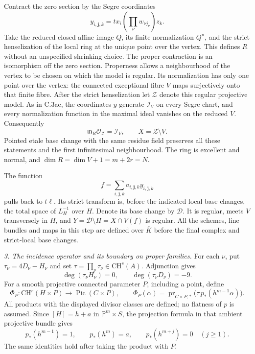 Contract the zero section by the Segre coordinates
\[
 y_{i,\mathbf j,k}=t x_i\left(\prod_\nu w_{\nu j_\nu}\right)z_k.
\]
Take the reduced closed affine image $Q$, its finite normalization
$Q^{\mathrm n}$, and the strict henselization of the local ring
at the unique point over the vertex. This defines $R$ without
an unspecified shrinking choice. The proper contraction is an
isomorphism off the zero section. Properness allows a neighbourhood
of the vertex to be chosen on which the model is regular. Its
normalization has only one point over the vertex: the connected
exceptional fibre $V$ maps surjectively onto that finite fibre.
After the strict henselization let $\mathcal Z$ denote this regular
projective model. As in C.3ae, the coordinates $y$ generate
$\mathcal I_V$ on every Segre chart, and every normalization
function in the maximal ideal vanishes on the reduced $V$.
Consequently
\[
 \mathfrak m_R\mathcal O_{\mathcal Z}=\mathcal I_V,
 \qquad X=\mathcal Z\setminus V.
\]
Pointed etale base change with the same residue field preserves
all these statements and the first infinitesimal neighbourhood.
The ring is excellent and normal, and
$\dim R=\dim V+1=m+2r=N$.

The function
\[
 f=\sum_{i,\mathbf j,k}a_{i,\mathbf j,k}y_{i,\mathbf j,k}
\]
pulls back to $t\ell$. Its strict transform is, before the
indicated local base changes, the total space of $L_H^{-1}$
over $H$. Denote its base change by $\mathcal D$. It is regular,
meets $V$ transversely in $H$, and
$Y=\mathcal D\setminus H=X\cap V(f)$ is regular. All the
schemes, line bundles and maps in this step are defined over
$\overline K$ before the final complex and strict-local base changes.

\emph{3. The incidence operator and its boundary on proper families.}
For each $\nu$, put $\tau_\nu=4D_\nu-H_\nu$ and set
$\tau=\prod_\nu\tau_\nu\in\mathrm{CH}^{s}(A)$. Adjunction gives
\[
 \deg(\tau_\nu H_\nu)=0,\qquad
 \deg(\tau_\nu D_\nu)=-9.
\]
For a smooth projective connected parameter $P$, including
a point, define
\[
 \Phi_P:\mathrm{CH}^r(H\times P)\longrightarrow
                  \operatorname{Pic}(C\times P),
 \qquad
 \Phi_P(\alpha)=\operatorname{pr}_{C\times P,*}
                       \bigl(\tau\,p_*(h^{m-1}\alpha)\bigr).
\]
All products with the displayed divisor classes are defined;
no flatness of $p$ is assumed. Since $[H]=h+a$ in
$\mathbb P^m\times S$, the projection formula in that ambient
projective bundle gives
\[
 p_*(h^{m-1})=1,\qquad p_*(h^m)=a,
 \qquad p_*(h^{m+j})=0\quad(j\ge1).
\]
The same identities hold after taking the product with $P$.

